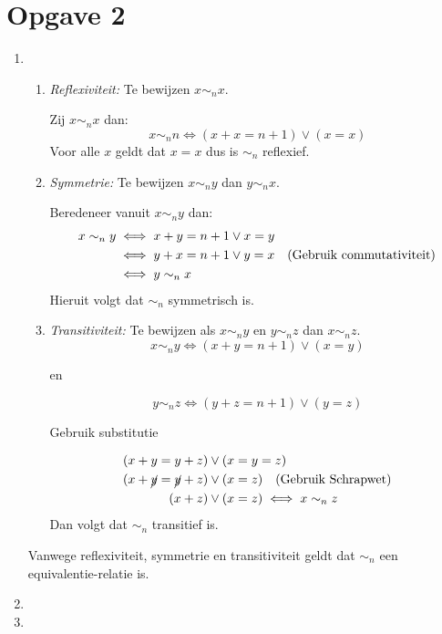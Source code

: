 \documentclass{article}
\begin{document}
\pagebreak
\section*{Opgave 2}
\begin{enumerate}[label=\alph*)]
    \item
          \begin{enumerate}[label=\arabic*.]
              \item \emph{Reflexiviteit:} Te bewijzen $x \sim_n x$.

                    Zij $x \sim_n x$ dan:
                    \[x \sim_n n \iff (x + x = n + 1) \vee (x = x)\]
                    Voor alle $x$ geldt dat $x = x$ dus is $\sim_n$ reflexief.
              \item \emph{Symmetrie:} Te bewijzen $x \sim_n y$ dan $y \sim_n x$.

                    Beredeneer vanuit $x \sim_n y$ dan:
                    \begin{align*}
                        x  \sim_n y & \iff x + y = n + 1 \vee x = y                                      \\
                                    & \iff y + x = n + 1 \vee y = x \quad (\text{Gebruik commutativiteit}) \\
                                    & \iff y \sim_n x
                    \end{align*}
                    Hieruit volgt dat $\sim_n$ symmetrisch is.
              \item \emph{Transitiviteit:}
                    Te bewijzen als $x \sim_n y$ en $y \sim_n z$ dan $x \sim_n z$.
                    \[x \sim_n y \iff (x + y = n + 1) \vee (x = y)\]
                    \begin{center}
                        en
                    \end{center}
                    \[y \sim_n z \iff (y + z = n + 1) \vee (y = z)\]
                    \begin{center}
                        Gebruik substitutie
                    \end{center}
                    \begin{align*}
                        (x + y = y + z)           & \vee (x = y = z)                            \\
                        (x + \cancel{y} = \cancel{y} + z) & \vee (x = z) \quad (\text{Gebruik Schrapwet}) \\
                        (x + z)                   & \vee (x = z) \iff x \sim_n z
                    \end{align*}
                    Dan volgt dat $\sim_n$ transitief is.
          \end{enumerate}
          Vanwege reflexiviteit, symmetrie en transitiviteit geldt dat $\sim_n$ een equivalentie-relatie is.

    \item
    \item
\end{enumerate}
\end{document}
